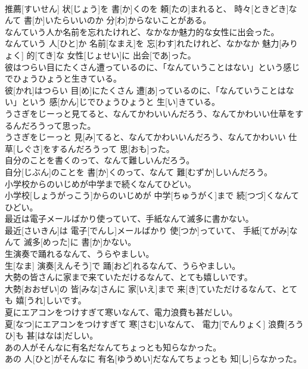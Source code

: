 \documentclass[8pt]{extreport}
\begin{document}
\begin{CJK}{UTF8}{min}
\\	推薦[すいせん] 状[じょう]を 書[か]くのを 頼[たの]まれると、 時々[ときどき]なんて 書[か]いたらいいのか 分[わ]からないことがある。
\\	なんていう人か名前を忘れたけれど、なかなか魅力的な女性に出会った。	
\\	なんていう 人[ひと]か 名前[なまえ]を 忘[わす]れたけれど、なかなか 魅力[みりょく] 的[てき]な 女性[じょせい]に 出会[であ]った。
\\	彼はつらい目にたくさん遭っているのに、「なんていうことはない」という感じでひょうひょうと生きている。	
\\	彼[かれ]はつらい 目[め]にたくさん 遭[あ]っているのに、「なんていうことはない」という 感[かん]じでひょうひょうと 生[い]きている。
\\	うさぎをじーっと見てると、なんてかわいいんだろう、なんてかわいい仕草をするんだろうって思った。	
\\	うさぎをじーっと 見[み]てると、なんてかわいいんだろう、なんてかわいい 仕草[しぐさ]をするんだろうって 思[おも]った。
\\	自分のことを書くのって、なんて難しいんだろう。	
\\	自分[じぶん]のことを 書[か]くのって、なんて 難[むずか]しいんだろう。
\\	小学校からのいじめが中学まで続くなんてひどい。	
\\	小学校[しょうがっこう]からのいじめが 中学[ちゅうがく]まで 続[つづ]くなんてひどい。
\\	最近は電子メールばかり使っていて、手紙なんて滅多に書かない。	
\\	最近[さいきん]は 電子[でんし]メールばかり 使[つか]っていて、 手紙[てがみ]なんて 滅多[めった]に 書[か]かない。
\\	生演奏で踊れるなんて、うらやましい。	
\\	生[なま] 演奏[えんそう]で 踊[おど]れるなんて、うらやましい。
\\	大勢の皆さんに家まで来ていただけるなんて、とても嬉しいです。	
\\	大勢[おおぜい]の 皆[みな]さんに 家[いえ]まで 来[き]ていただけるなんて、とても 嬉[うれ]しいです。
\\	夏にエアコンをつけすぎて寒いなんて、電力浪費も甚だしい。	
\\	夏[なつ]にエアコンをつけすぎて 寒[さむ]いなんて、 電力[でんりょく] 浪費[ろうひ]も 甚[はなは]だしい。
\\	あの人がそんなに有名だなんてちょっとも知らなかった。	
\\	あの 人[ひと]がそんなに 有名[ゆうめい]だなんてちょっとも 知[し]らなかった。

\end{CJK}
\end{document}
